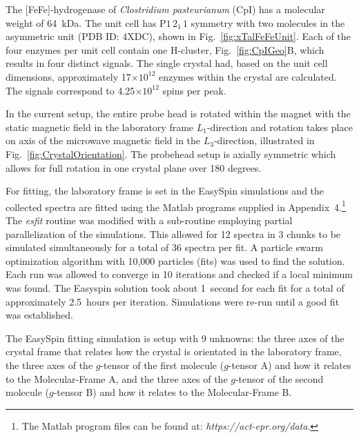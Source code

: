 The [FeFe]-hydrogenase of \textit{Clostridium pasteurianum} (CpI) has a molecular weight of 64~kDa. The unit cell has P$1\,2_1\,1$ symmetry with two molecules in the asymmetric unit (PDB ID: 4XDC), shown in Fig.~\ref{fig:xTalFeFeUnit}. Each of the four enzymes per unit cell contain one H-cluster, Fig.~\ref{fig:CpIGeo}B, which results in four distinct signals. The single crystal had, based on the unit cell dimensions, approximately 17$\times10^{12}$ enzymes within the crystal are calculated. The signals correspond to 4.25$\times10^{12}$ spins per peak. 

In the current setup, the entire probe head is rotated within the magnet with the static magnetic field in the laboratory frame $L_1$-direction and rotation takes place on axis of the microwave magnetic field in the $L_3$-direction, illustrated in Fig.~\ref{fig:CrystalOrientation}. The probehead setup is axially symmetric which allows for full rotation in one crystal plane over 180 degrees. 

For fitting, the laboratory frame is set in the EasySpin simulations and the collected spectra are fitted using the Matlab programs supplied in Appendix~4.\footnote{The Matlab program files can be found at: \textit{https://act-epr.org/data}.} The \textit{esfit} routine was modified with a sub-routine employing partial parallelization of the simulations. This allowed for 12 spectra in 3 chunks to be simulated simultaneously for a total of 36 spectra per fit. A particle swarm optimization algorithm with 10,000 particles (fits) was used to find the solution. Each run was allowed to converge in 10 iterations and checked if a local minimum was found. The Easyspin solution took about 1~second for each fit for a total of approximately 2.5~hours per iteration. Simulations were re-run until a good fit was established.

The EasySpin fitting simulation is setup with 9 unknowns: the three axes of the crystal frame that relates how the crystal is orientated in the laboratory frame, the three axes of the $g$-tensor of the first molecule ($g$-tensor A) and how it relates to the Molecular-Frame A, and the three axes of the $g$-tensor of the second molecule ($g$-tensor B) and how it relates to the Molecular-Frame B. 

